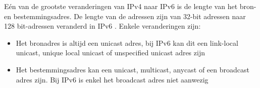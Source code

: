 Eén van de grootste veranderingen van IPv4 naar IPv6 is de lengte van het bron- en bestemmingsadres. De lengte van de adressen zijn van 32-bit adressen naar 128 bit-adressen veranderd in IPv6 \autocite{Graziani2017}. Enkele veranderingen zijn:

\begin{itemize}
    \item Het bronadres is altijd een unicast adres, bij IPv6 kan dit een link-local unicast, unique local unicast of unspecified unicast adres zijn
    \item Het bestemmingsadres kan een unicast, multicast, anycast of een broadcast adres zijn. Bij IPv6 is enkel het broadcast adres niet aanwezig
\end{itemize}
